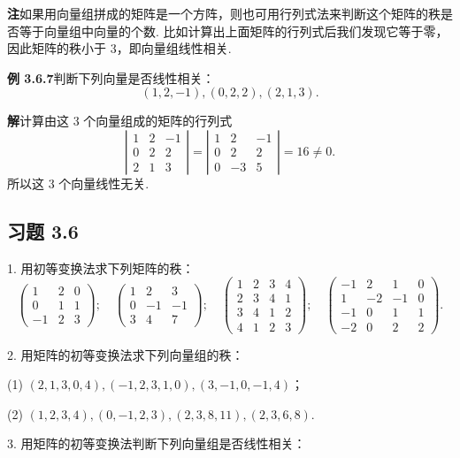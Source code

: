 \documentclass[UTF8,12pt,a4paper,fontset=fandol]{ctexart}
\begin{document}
\noindent\textbf{注}\quad 如果用向量组拼成的矩阵是一个方阵，则也可用行列式法来判断这个矩阵的秩是否等于向量组中向量的个数. 比如计算出上面矩阵的行列式后我们发现它等于零，因此矩阵的秩小于 3，即向量组线性相关.

\noindent\textbf{例 3.6.7}\quad 判断下列向量是否线性相关：
\[
(1,2,-1),(0,2,2),(2,1,3).
\]

\noindent\textbf{解}\quad 计算由这 3 个向量组成的矩阵的行列式
\[
\left|\begin{array}{rrr}
1&2&-1\\
0&2&2\\
2&1&3
\end{array}\right|
=
\left|\begin{array}{rrr}
1&2&-1\\
0&2&2\\
0&-3&5
\end{array}\right|
=16\neq 0.
\]
所以这 3 个向量线性无关.

\subsection*{习题 3.6}

1. 用初等变换法求下列矩阵的秩：
\[
\left(\begin{array}{rrr}
1&2&0\\
0&1&1\\
-1&2&3
\end{array}\right);\quad
\left(\begin{array}{rrr}
1&2&3\\
0&-1&-1\\
3&4&7
\end{array}\right);\quad
\left(\begin{array}{rrrr}
1&2&3&4\\
2&3&4&1\\
3&4&1&2\\
4&1&2&3
\end{array}\right);\quad
\left(\begin{array}{rrrr}
-1&2&1&0\\
1&-2&-1&0\\
-1&0&1&1\\
-2&0&2&2
\end{array}\right).
\]

2. 用矩阵的初等变换法求下列向量组的秩：

(1) $(2,1,3,0,4),(-1,2,3,1,0),(3,-1,0,-1,4)$；

(2) $(1,2,3,4),(0,-1,2,3),(2,3,8,11),(2,3,6,8)$.

3. 用矩阵的初等变换法判断下列向量组是否线性相关：
\end{document}
